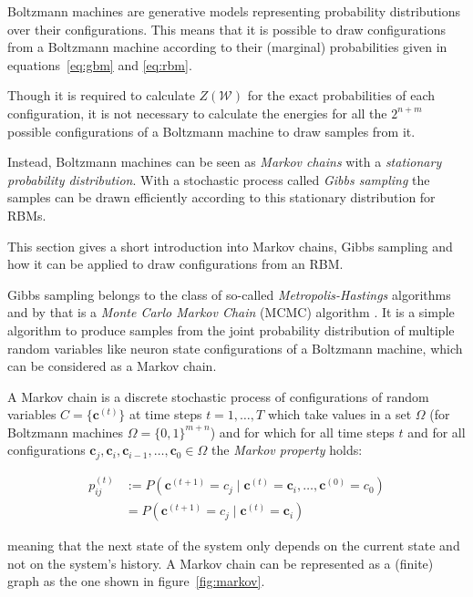 Boltzmann machines are generative models representing probability distributions over their configurations. This means that it is possible to draw configurations from a Boltzmann machine
according to their (marginal) probabilities given in equations~\ref{eq:gbm} and \ref{eq:rbm}.

Though it is required to calculate $Z(\mathcal{W})$ for the exact probabilities of each configuration,
it is not necessary to calculate the energies for all the $2^{n+m}$ possible configurations of 
a Boltzmann machine to draw samples from it.

Instead, Boltzmann machines can be seen as \textit{Markov chains} with a \textit{stationary probability
distribution}. With a stochastic process called \textit{Gibbs sampling} the samples can be drawn efficiently according to this stationary distribution for RBMs.

This section gives a short introduction into Markov chains, Gibbs sampling and how it can be applied 
to draw configurations from an RBM.

Gibbs sampling belongs to the class of so-called \textit{Metropolis-Hastings} algorithms and by that is 
a \textit{Monte Carlo Markov Chain} (MCMC) algorithm \cite{hastings1970monte}. It is a simple algorithm to produce samples from the joint probability distribution of multiple random variables like neuron state configurations
of a Boltzmann machine, which can be considered as a Markov chain.

A Markov chain is a discrete stochastic process of configurations of random variables $C=\{\bm{c}^{(t)}\}$
at time steps $t=1, \dots, T$ which take values in a set $\Omega$ (for Boltzmann machines 
$\Omega=\{0,1\}^{m+n}$) and for which for all time steps $t$ and for all configurations 
$\bm{c}_j, \bm{c}_i, \bm{c}_{i-1}, \dots, \bm{c}_0 \in \Omega$ the \textit{Markov property} holds:

\begin{align}
    p_{ij}^{(t)} &:= P(\bm{c}^{(t+1)} = c_j \mid \bm{c}^{(t)} = \bm{c}_i, \dots, \bm{c}^{(0)} = c_0) \\
                 & = P(\bm{c}^{(t+1)} = c_j \mid \bm{c}^{(t)} = \bm{c}_i) 
\end{align}

meaning that the next state of the system only depends on the current state and not on the system's history. A Markov chain can be represented as a (finite) graph as the one shown in figure~\ref{fig:markov}.

